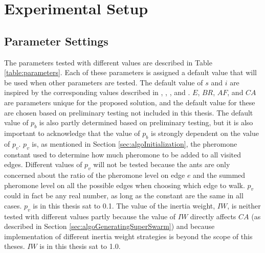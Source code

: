 \section{Experimental Setup}

 
\subsection{Parameter Settings}
\label{subsec:parameterSettings_setup}
The parameters tested with different values are described in Table \vref{table:parameters}. Each of these parameters is assigned a default value that will be used when other parameters are tested. The default value of $s$ and $i$ are inspired by the corresponding values described in \citet{salehi-nezhad07}, \citet{poorzahedy11}, \citet{sedighpour14}, and \citet{kechagiopoulos14}. $E$, $BR$, $AF$, and $CA$ are parameters unique for the proposed solution, and the default value for these are chosen based on preliminary testing not included in this thesis. The default value of $p_b$ is also partly determined based on preliminary testing, but it is also important to acknowledge that the value of $p_b$ is strongly dependent on the value of $p_v$. $p_v$ is, as mentioned in Section \vref{sec:algoInitialization}, the pheromone constant used to determine how much pheromone to be added to all visited edges. Different values of $p_v$ will not be tested because the ants are only concerned about the ratio of the pheromone level on edge $e$ and the summed pheromone level on all the possible edges when choosing which edge to walk. $p_v$ could in fact be any real number, as long as the constant are the same in all cases. $p_v$ is in this thesis sat to 0.1. The value of the inertia weight, $IW$, is neither tested with different values partly because the value of $IW$ directly affects $CA$ (as described in Section \vref{sec:algoGeneratingSuperSwarm}) and because implementation of different inertia weight strategies is beyond the scope of this theses. $IW$ is in this thesis sat to 1.0. 

